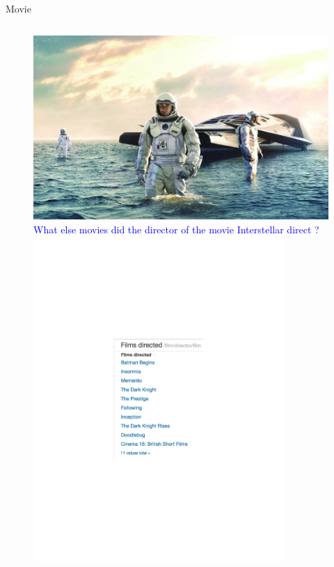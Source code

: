 \documentclass{beamer}
\begin{document}
\begin{frame}{Movie}
	\begin{figure}
	\begin{columns}[c]
			\centering\includegraphics[width=1.0\textwidth]{introduction/interstellar.jpg}\\
			\textcolor{blue}{What else movies did the director of the movie Interstellar direct ?}
			\centering\includegraphics[width=0.85\textwidth]{introduction/films_directed.pdf}
		\end{columns}
	\end{figure}
\end{frame}
\end{document}
